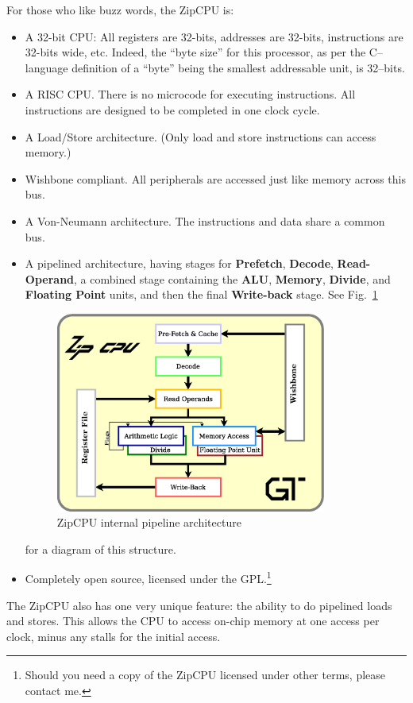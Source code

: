 \documentclass{gqtekspec}
\begin{document}
For those who like buzz words, the ZipCPU is:
\begin{itemize}
\item A 32-bit CPU: All registers are 32-bits, addresses are 32-bits,
		instructions are 32-bits wide, etc.  Indeed, the ``byte size''
		for this processor, as per the C--language definition of a
		``byte'' being the smallest addressable unit, is 32--bits.
\item A RISC CPU.  There is no microcode for executing instructions.  All
	instructions are designed to be completed in one clock cycle.
\item A Load/Store architecture.  (Only load and store instructions
		can access memory.)
\item Wishbone compliant.  All peripherals are accessed just like
		memory across this bus.
\item A Von-Neumann architecture.  The instructions and data share a 
		common bus.
\item A pipelined architecture, having stages for {\bf Prefetch},
	{\bf Decode}, {\bf Read-Operand}, a combined stage containing
	the {\bf ALU}, {\bf Memory}, {\bf Divide}, and {\bf Floating Point}
	units, and then the final {\bf Write-back} stage. 
		See Fig.~\ref{fig:cpu}
\begin{figure}\begin{center}
\includegraphics[width=3.5in]{../gfx/cpu.eps}
\caption{ZipCPU internal pipeline architecture}\label{fig:cpu}
\end{center}\end{figure}
		for a diagram of this structure.
\item Completely open source, licensed under the GPL.\footnote{Should you
	need a copy of the ZipCPU licensed under other terms, please 
	contact me.}
\end{itemize}

The ZipCPU also has one very unique feature: the ability to do pipelined loads
and stores.  This allows the CPU to access on-chip memory at one access per
clock, minus any stalls for the initial access.
\end{document}
